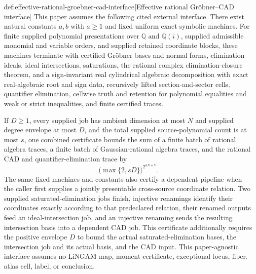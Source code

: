 \begin{remarkv}{def:effective-rational-groebner-cad-interface}[Effective rational Gröbner--CAD interface]
This paper assumes the following cited external interface. There exist natural constants \(a,b\) with \(a\ge 1\) and fixed uniform exact symbolic machines. For finite supplied polynomial presentations over \(\mathbb Q\) and \(\mathbb Q(i)\), supplied admissible monomial and variable orders, and supplied retained coordinate blocks, these machines terminate with certified Gröbner bases and normal forms, elimination ideals, ideal intersections, saturations, the rational complex elimination-closure theorem, and a sign-invariant real cylindrical algebraic decomposition with exact real-algebraic root and sign data, recursively lifted section-and-sector cells, quantifier elimination, cellwise truth and retention for polynomial equalities and weak or strict inequalities, and finite certified traces.

If \(D\ge 1\), every supplied job has ambient dimension at most \(N\) and supplied degree envelope at most \(D\), and the total supplied source-polynomial count is at most \(s\), one combined certificate bounds the sum of a finite batch of rational algebra traces, a finite batch of Gaussian-rational algebra traces, and the rational CAD and quantifier-elimination trace by
\[
\bigl(\max\{2,sD\}\bigr)^{2^{aN+b}}.
\]
The same fixed machines and constants also certify a dependent pipeline when the caller first supplies a jointly presentable cross-source coordinate relation. Two supplied saturated-elimination jobs finish, injective renamings identify their coordinates exactly according to that predeclared relation, their renamed outputs feed an ideal-intersection job, and an injective renaming sends the resulting intersection basis into a dependent CAD job. This certificate additionally requires the positive envelope \(D\) to bound the actual saturated-elimination bases, the intersection job and its actual basis, and the CAD input. This paper-agnostic interface assumes no LiNGAM map, moment certificate, exceptional locus, fiber, atlas cell, label, or conclusion.
\end{remarkv}

